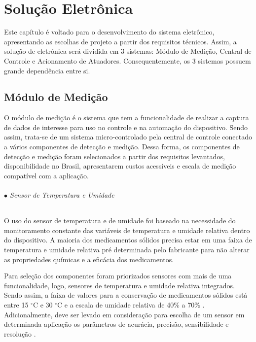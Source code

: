 \chapter[Solução Eletrônica]{Solução Eletrônica}

Este capítulo é voltado para o desenvolvimento do sistema eletrônico, apresentando as escolhas de projeto a partir dos requisitos técnicos. Assim, a solução de eletrônica será dividida em 3 sistemas: Módulo de Medição, Central de Controle e Acionamento de Atuadores. Consequentemente, os 3 sistemas possuem grande dependência entre si.

\section{Módulo de Medição}

O módulo de medição é o sistema que tem a  funcionalidade de realizar a captura de dados de interesse para uso no controle e na automação do dispositivo. Sendo assim, trata-se de um sistema micro-controlado pela central de controle conectado a vários componentes de detecção e medição. Dessa forma, os componentes de detecção e medição foram selecionados a partir dos requisitos levantados, disponibilidade no Brasil, apresentarem custos acessíveis e escala de medição compatível com a aplicação.

    \subparagraph*{$\bullet$ Sensor de Temperatura e Umidade} \hfill
    
    O uso do sensor de temperatura e de umidade foi baseado na necessidade do monitoramento constante das variáveis de temperatura e umidade relativa dentro do dispositivo. A maioria dos medicamentos sólidos precisa estar em uma faixa de temperatura e umidade relativa pré determinada pelo fabricante para não alterar as propriedades químicas e a eficácia dos medicamentos. 
    
    Para seleção dos componentes foram priorizados sensores com mais de uma funcionalidade, logo, sensores de temperatura e umidade relativa integrados. Sendo assim, a faixa de valores para a conservação de medicamentos sólidos está entre 15 $^\circ$C e 30 $^\circ$C e a escala de umidade relativa de 40\% a 70\% \cite{Pinto_2016}. Adicionalmente, deve ser levado em consideração para escolha de um sensor em determinada aplicação os parâmetros de acurácia, precisão, sensibilidade e resolução \cite{webster2018measurement}. 
    

